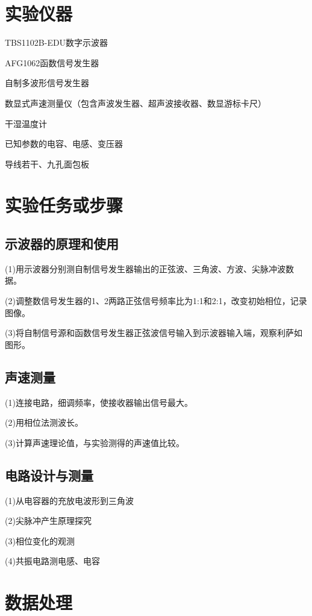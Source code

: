 \documentclass[UTF8]{ctexart}
\begin{document}
\section{实验仪器}

\noindent TBS1102B-EDU数字示波器

\noindent AFG1062函数信号发生器

\noindent 自制多波形信号发生器

\noindent 数显式声速测量仪（包含声波发生器、超声波接收器、数显游标卡尺）

\noindent 干湿温度计

\noindent 已知参数的电容、电感、变压器

\noindent 导线若干、九孔面包板

\section{实验任务或步骤}

\subsection{示波器的原理和使用}
\noindent(1)用示波器分别测自制信号发生器输出的正弦波、三角波、方波、尖脉冲波数据。

\noindent(2)调整数信号发生器的1、2两路正弦信号频率比为1:1和2:1，改变初始相位，记录图像。

\noindent(3)将自制信号源和函数信号发生器正弦波信号输入到示波器输入端，观察利萨如图形。
\subsection{声速测量}
\noindent(1)连接电路，细调频率，使接收器输出信号最大。

\noindent(2)用相位法测波长。

\noindent(3)计算声速理论值，与实验测得的声速值比较。
\subsection{电路设计与测量}

\noindent(1)从电容器的充放电波形到三角波

\noindent(2)尖脉冲产生原理探究

\noindent(3)相位变化的观测

\noindent(4)共振电路测电感、电容

\section{数据处理}
\end{document}
